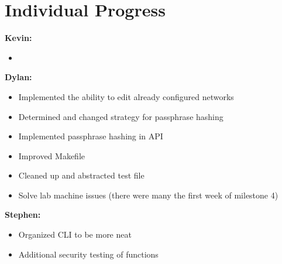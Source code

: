 \documentclass[11pt]{article}
\begin{document}
\section{Individual Progress}

\textbf{Kevin:}
\begin{itemize}
  \item
\end{itemize}

\textbf{Dylan:}
\begin{itemize}
  \item Implemented the ability to edit already configured networks
  \item Determined and changed strategy for passphrase hashing
  \item Implemented passphrase hashing in API
  \item Improved Makefile
  \item Cleaned up and abstracted test file
  \item Solve lab machine issues (there were many the first week of milestone 4)
\end{itemize}

\textbf{Stephen:}
\begin{itemize}
  \item Organized CLI to be more neat
  \item Additional security testing of functions
\end{itemize}
\end{document}
